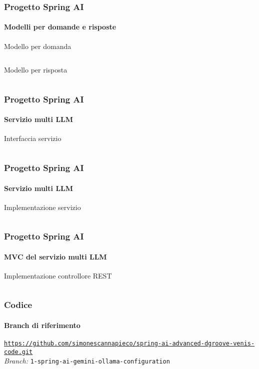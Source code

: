 %
\begin{frame}[t,fragile] \frametitle{Progetto Spring AI}
    \framesubtitle{Modelli per domande e risposte}
        \begin{block}{Modello per domanda}
			{\tiny\inputminted{java}{code/Question.java}}
    	\end{block}
        \begin{block}{Modello per risposta}
			{\tiny\inputminted{java}{code/Answer.java}}
    	\end{block}
\end{frame}
%
\begin{frame}[t,fragile] \frametitle{Progetto Spring AI}
    \framesubtitle{Servizio multi LLM}
        \begin{block}{Interfaccia servizio}
			{\tiny\inputminted{java}{code/QuestionService.java}}
    	\end{block}
\end{frame}
%
\begin{frame}[t,fragile] \frametitle{Progetto Spring AI}
    \framesubtitle{Servizio multi LLM}
        \vspace*{-.7cm}
        \begin{block}{Implementazione servizio}
			{\tiny\inputminted{java}{code/QuestionServiceImpl.java}}
    	\end{block}
\end{frame}
%
\begin{frame}[t,fragile] \frametitle{Progetto Spring AI}
    \framesubtitle{MVC del servizio multi LLM}
    	\vspace*{-.7cm}
        \begin{block}{Implementazione controllore REST}
			{\tiny\inputminted{java}{code/QuestionController.java}}
    	\end{block}
\end{frame}
%
\begin{frame}[fragile] \frametitle{Codice}
    \framesubtitle{Branch di riferimento}
	\begin{center}
		{\scriptsize \href{https://github.com/simonescannapieco/spring-ai-advanced-dgroove-venis-code.git}{\texttt{https://github.com/simonescannapieco/spring-ai-advanced-dgroove-venis-code.git}}}\\
		\textit{Branch:} \alert{\texttt{1-spring-ai-gemini-ollama-configuration}}
	\end{center}
\end{frame}